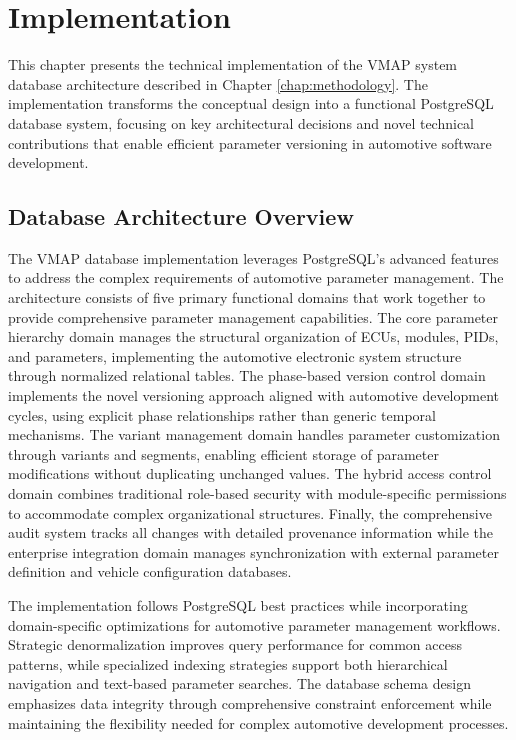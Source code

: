 \chapter{Implementation}
\label{chap:implementation}

This chapter presents the technical implementation of the \ac{VMAP} system database architecture described in Chapter \ref{chap:methodology}. The implementation transforms the conceptual design into a functional PostgreSQL database system, focusing on key architectural decisions and novel technical contributions that enable efficient parameter versioning in automotive software development.

\section{Database Architecture Overview}
\label{sec:database-architecture-overview}

The \ac{VMAP} database implementation leverages PostgreSQL's advanced features to address the complex requirements of automotive parameter management. The architecture consists of five primary functional domains that work together to provide comprehensive parameter management capabilities. The core parameter hierarchy domain manages the structural organization of ECUs, modules, PIDs, and parameters, implementing the automotive electronic system structure through normalized relational tables. The phase-based version control domain implements the novel versioning approach aligned with automotive development cycles, using explicit phase relationships rather than generic temporal mechanisms. The variant management domain handles parameter customization through variants and segments, enabling efficient storage of parameter modifications without duplicating unchanged values. The hybrid access control domain combines traditional role-based security with module-specific permissions to accommodate complex organizational structures. Finally, the comprehensive audit system tracks all changes with detailed provenance information while the enterprise integration domain manages synchronization with external parameter definition and vehicle configuration databases.

The implementation follows PostgreSQL best practices while incorporating domain-specific optimizations for automotive parameter management workflows. Strategic denormalization improves query performance for common access patterns, while specialized indexing strategies support both hierarchical navigation and text-based parameter searches. The database schema design emphasizes data integrity through comprehensive constraint enforcement while maintaining the flexibility needed for complex automotive development processes.

